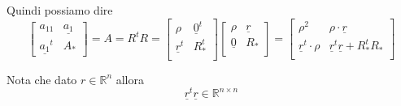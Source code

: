 Quindi possiamo dire 
\begin{equation*}
    \left[\begin{array}{c|ccc}
        a_{11}&\underline{a_1}\\
        \hline
        \underline{a_1}^t & A_\ast
    \end{array}\right] = A = R^tR= \left[\begin{array}{c|c}
        \rho &\underline{0}^t\\
        \hline
        \underline{r}^t&R_\ast^t\\
    \end{array}\right]\left[\begin{array}{c|c}
        \rho &\underline{r}\\
        \hline
        \underline{0}&R_\ast\\
    \end{array}\right]=\left[\begin{array}{c|c}
        \rho^2 &\rho \cdot\underline{r}\\
        \hline
        \underline{r}^t\cdot\rho &\underline{r}^t\underline{r}+R_\ast^t R_\ast\\
    \end{array}\right] 
\end{equation*} 

\begin{nota}
    Nota che dato $r\in \mathbb{R}^n$ allora
    \begin{equation*}
        \underline{r}^t\underline{r} \in \mathbb{R}^{n\times n}
    \end{equation*}
\end{nota}

